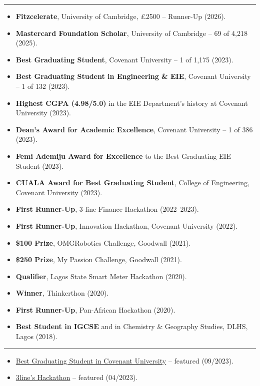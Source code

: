 \documentclass[11pt, a4paper]{article}
\newcommand{\sectiontitle}[1]{\vspace{1mm}{\color{primaryColor}\noindent\textbf{#1}}\vspace{1.5mm}\hrule\vspace{1mm}}
\begin{document}
\sectiontitle{Honors \& Awards}
\begin{itemize}    
    \item \textbf{Fitzcelerate}, University of Cambridge, £2500 -- Runner-Up (2026).
    \item \textbf{Mastercard Foundation Scholar}, University of Cambridge -- 69 of 4{,}218 (2025).
    \item \textbf{Best Graduating Student}, Covenant University -- 1 of 1{,}175 (2023).
    \item \textbf{Best Graduating Student in Engineering \& EIE}, Covenant University -- 1 of 132 (2023).
    \item \textbf{Highest CGPA (4.98/5.0)} in the EIE Department's history at Covenant University (2023).
    \item \textbf{Dean's Award for Academic Excellence}, Covenant University -- 1 of 386 (2023).
    \item \textbf{Femi Ademiju Award for Excellence} to the Best Graduating EIE Student (2023).
    \item \textbf{CUALA Award for Best Graduating Student}, College of Engineering, Covenant University (2023).
    \item \textbf{First Runner-Up}, 3-line Finance Hackathon (2022--2023).
    \item \textbf{First Runner-Up}, Innovation Hackathon, Covenant University (2022).
    \item \textbf{\$100 Prize}, OMGRobotics Challenge, Goodwall (2021).
    \item \textbf{\$250 Prize}, My Passion Challenge, Goodwall (2021).
    \item \textbf{Qualifier}, Lagos State Smart Meter Hackathon (2020).
    \item \textbf{Winner}, Thinkerthon (2020).
    \item \textbf{First Runner-Up}, Pan-African Hackathon (2020).
    \item \textbf{Best Student in IGCSE} and in Chemistry \& Geography Studies, DLHS, Lagos (2018).
\end{itemize}



\sectiontitle{Media Appearances}
\begin{itemize}
    \item \href{https://covenantuniversity.edu.ng/information/more/covenant-news/634-release-of-eagles-2023-283-students-bag-1st-class-degrees}{Best Graduating Student in Covenant University} -- featured (09/2023).
    \item \href{https://techcabal.com/2023/05/01/3lines-hackathon-targets-ai-integration-in-nigerias-financial-services/}{3line's Hackathon} -- featured (04/2023).
\end{itemize}
\end{document}
